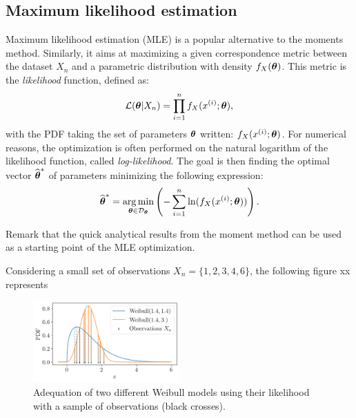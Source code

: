 \subsection*{Maximum likelihood estimation}
Maximum likelihood estimation (MLE) is a popular alternative to the moments method. 
Similarly, it aims at maximizing a given correspondence metric between the dataset $X_n$ and a parametric distribution with density $f_X({\boldsymbol{\theta}})$.
This metric is the \textit{likelihood} function, defined as:
\begin{equation}
    \mathcal{L}({\boldsymbol{\theta}}|X_n) = \prod_{i=1}^{n} f_X(x^{(i)}; {\boldsymbol{\theta}}), 
\end{equation}
with the PDF taking the set of parameters ${\boldsymbol{\theta}}$ written: $f_X(x^{(i)}; {\boldsymbol{\theta}})$. For numerical reasons, the optimization is often performed on the natural logarithm of the likelihood function, called \textit{log-likelihood}. 
The goal is then finding the optimal vector $\widehat{{\boldsymbol{\theta}}}^*$ of parameters minimizing the following expression: 
\begin{equation}
    \widehat{{\boldsymbol{\theta}}}^* = \operatorname*{arg\,min}_{{\boldsymbol{\theta}} \in \mathcal{D}_{{\boldsymbol{\theta}}}} \left(-\sum_{i=1}^{n} \mathrm{ln}(f_X(x^{(i)}; {\boldsymbol{\theta}})) \right).
\end{equation}

Remark that the quick analytical results from the moment method can be used as a starting point of the MLE optimization. 

\begin{example}
    \label{ex:mle}
    Considering a small set of observations $X_n = \{1, 2, 3, 4, 6\}$, the following figure xx represents 
    \begin{figure}[H]
        \centering
        \includegraphics[width=0.5\textwidth]{../numerical_experiments/chapter1/figures/MLE.png}
        \caption{Adequation of two different Weibull models using their likelihood with a sample of observations (black crosses). }
        \label{fig:MLE}
    \end{figure}
\end{example}


